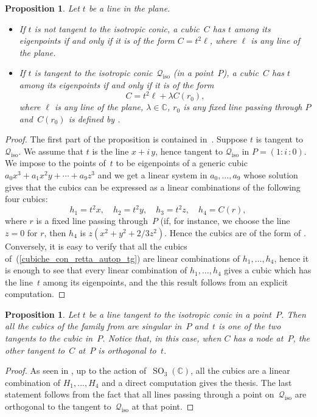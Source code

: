 \documentclass[a4paper, 11pt, reqno]{amsart}
\theoremstyle{plain}
\newtheorem{prop}[lemma]{Proposition}
\theoremstyle{definition}
\newcommand{\C}{\mathbb{C}}
\newcommand{\iii}{\textit{i}\,}
\newcommand{\iso}{\mathcal{Q}_{\mathrm{iso}}}
\newcommand{\SO}{\operatorname{SO}}
\begin{document}
\begin{prop}
\label{prop:eigenline_non_tangent}
Let $t$ be a line in the plane.
%
\begin{itemize}
   \item 
   If $t$ is not tangent to the isotropic conic, a cubic~$C$ has $t$ among its eigenpoints if and 
only if it is of the form $C = t^2\ell$, where $\ell$ is any line of the plane.
  \item 
  If $t$ is tangent to the isotropic conic~$\iso$ (in a point~$P$),
  a cubic~$C$ has $t$ among its eigenpoints if and only if it is of the form
  \begin{equation}
  \label{cubiche_con_retta_autop_tg}
    C = t^2 \ell+\lambda C(r_0),
  \end{equation}
  where $\ell$ is any line of the plane, $\lambda \in \C$, 
  $r_0$ is any fixed line passing through $P$ and~$C(r_0)$ is
  defined by .
\end{itemize}
%
\end{prop}
\begin{proof}
The first part of the proposition is contained in~.
Suppose $t$ is tangent to $\iso$. We assume that $t$ is the line
$x+\iii y$, hence tangent to $\iso$ in $P = (1: \iii: 0)$.
We impose to the points
of~$t$ to be eigenpoints of a generic cubic $a_0x^3+a_1x^2y+\cdots+a_9z^3$
and we get a linear system in $a_0, \dots, a_9$ whose solution gives that
the cubics can be expressed as a linear combinations of the following
four cubics:
%
\[
  h_1 = t^2x, \quad
  h_2 = t^2y, \quad
  h_3 = t^2z, \quad
  h_4 = C(r),
\]
%
where $r$ is a fixed line passing through~$P$ (if, for instance, 
we choose the line $z=0$ for $r$, 
then $h_4$ is $z(x^2 + y^2 + 2/3z^2)$. Hence the cubics are of the
form of . Conversely, it is easy to verify
that all the cubics of~(\ref{cubiche_con_retta_autop_tg}) are
linear combinations of $h_1, \dots, h_4$, hence it is enough
to see that every linear combination of $h_1, \dots, h_4$ gives a
cubic which has the line~$t$ among its eigenpoints, and the this result follows from an explicit computation.
\end{proof}

\begin{prop}
Let $t$ be a line tangent to the isotropic conic in a point~$P$.
Then all the cubics of the family from  are singular in~$P$ and~$t$ is one of the two tangents to the cubic in~$P$.
Notice that, in this case, when $C$ has a node at~$P$, the other tangent to~$C$ at~$P$ is orthogonal to~$t$.
\end{prop}
\begin{proof}
As seen in , up to the action of~$\SO_3(\C)$, all the
cubics are a linear combination of $H_1, \dots, H_4$ and a direct
computation gives the thesis.
The last statement follows from the fact that all lines passing through a point on~$\iso$ are orthogonal to the tangent to~$\iso$ at that point.
\end{proof}
\end{document}

